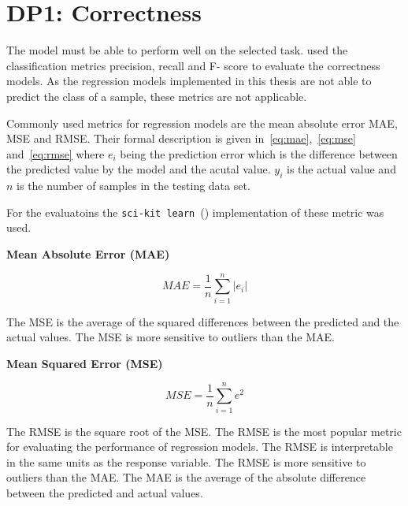 \section{DP1: Correctness}\label{sec:dp1:-correctness}

The model must be able to perform well on the selected task.
\cite{siebert2022construction} used the classification metrics precision, recall and F-
score to evaluate the correctness models.
As the regression models implemented in this thesis are not able to predict
the class of a sample, these metrics are not applicable.

Commonly used metrics for regression models are the mean absolute error \ac{MAE},
\ac{MSE} and \ac{RMSE}.
Their formal description is given in~\ref{eq:mae},~\ref{eq:mse} and~\ref{eq:rmse} where
\(e_i\) being the prediction error which is the difference between the predicted value
by the model and the acutal value.
\(y_i\) is the actual value and \(n\) is the number of samples in the testing data set.

For the evaluatoins the \texttt{sci-kit learn}~(\cite{scikit-learn}) implementation of
these metric was
used.

\textbf{Mean Absolute Error (MAE)}

\begin{tcolorbox}[arc=0pt,boxrule=0.5pt]
    \begin{equation}
        MAE = \frac{1}{n} \sum_{i=1}^{n} |e_i|
        \label{eq:mae}
    \end{equation}
\end{tcolorbox}

The MSE is the average of the squared differences between the predicted and
the actual values.
The MSE is more sensitive to outliers than the MAE.

\textbf{Mean Squared Error (MSE)}

\begin{tcolorbox}[arc=0pt,boxrule=0.5pt]
    \begin{equation}
        \label{eq:mse}
        MSE = \frac{1}{n} \sum_{i=1}^{n} e^2
    \end{equation}
\end{tcolorbox}

The RMSE is the square root of the MSE. The RMSE is the most popular metric
for evaluating the
performance of regression models. The RMSE is interpretable in the same units
as the response
variable. The RMSE is more sensitive to outliers than the MAE.
The MAE is the average of the absolute difference between the predicted and
actual values.

